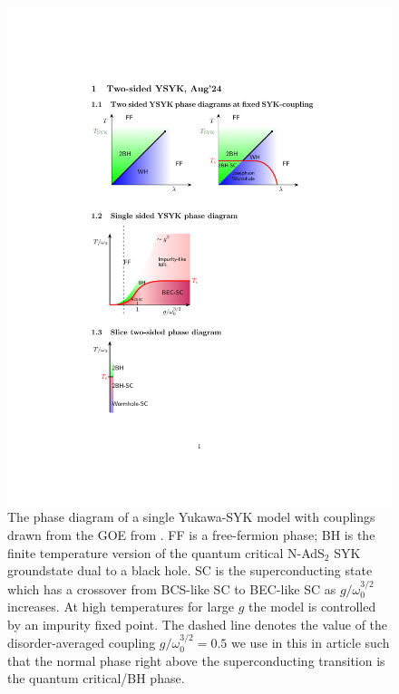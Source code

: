 \begin{figure}[t!]
    \centering
    \includegraphics[width=0.5\linewidth]{figures/chapter3/YSYK-PhaseDiagram-v3.pdf}
    \caption{The phase diagram of a single Yukawa-SYK model with couplings drawn from the GOE from \cite{esterlis2019cooper}. FF is a free-fermion phase; BH is the finite temperature version of the quantum critical N-AdS$_2$ SYK groundstate dual to a black hole. SC is the superconducting state which has a crossover from BCS-like SC to BEC-like SC as $g/\omega_0^{3/2}$ increases. At high temperatures for large $g$ the model is controlled by an impurity fixed point. 
    The dashed line denotes the value of the disorder-averaged coupling $g/\omega_0^{3/2}=0.5$ we use in this in article such that the normal phase right above the superconducting transition is the quantum critical/BH phase.}
    \label{fig:YSYK-phase-diagram}
\end{figure}

